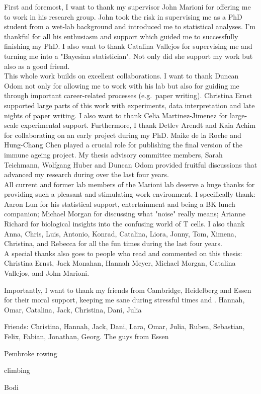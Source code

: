 
\begin{acknowledgements}      


First and foremost, I want to thank my supervisor John Marioni for offering me to work in his research group. John took the risk in supervising me as a PhD student from a wet-lab background and introduced me to statistical analyses. I'm thankful for all his enthusiasm and support which guided me to successfully finishing my PhD. I also want to thank Catalina Vallejos for supervising me and turning me into a "Bayesian statistician". Not only did she support my work but also as a good friend. \\

This whole work builds on excellent collaborations. I want to thank Duncan Odom not only for allowing me to work with his lab but also for guiding me through important career-related processes (e.g.~paper writing). Christina Ernst supported large parts of this work with experiments, data interpretation and late nights of paper writing. I also want to thank Celia Martinez-Jimenez for large-scale experimental support. Furthermore, I thank Detlev Arendt and Kaia Achim for collaborating on an early project during my PhD. Maike de la Roche and Hung-Chang Chen played a crucial role for publishing the final version of the immune ageing project. My thesis advisory committee members, Sarah Teichmann, Wolfgang Huber and Duncan Odom provided fruitful discussions that advanced my research during over the last four years. \\

All current and former lab members of the Marioni lab deserve a huge thanks for providing such a pleasant and stimulating work environment. I specifically thank: Aaron Lun for his statistical support, entertainment and being a BK lunch companion; Michael Morgan for discussing what "noise" really means; Arianne Richard for biological insights into the confusing world of T cells. I also thank Anna, Chris, Luis, Antonio, Konrad, Catalina, Liora, Jonny, Tom, Ximena, Christina, and Rebecca for all the fun times during the last four years. \\

A special thanks also goes to people who read and commented on this thesis: Christina Ernst, Jack Monahan, Hannah Meyer, Michael Morgan, Catalina Vallejos, and John Marioni. 

\newpage
\thispagestyle{empty}
 

Importantly, I want to thank my friends from Cambridge, Heidelberg and Essen for their moral support, keeping me sane during stressful times and . Hannah, Omar, Catalina, Jack, Christina, Dani, Julia

Friends: Christina, Hannah, Jack, Dani, Lara, Omar, Julia, Ruben,  Sebastian, Felix, Fabian, Jonathan, Georg. The guys from Essen

Pembroke rowing

climbing

Bodi

\end{acknowledgements}
